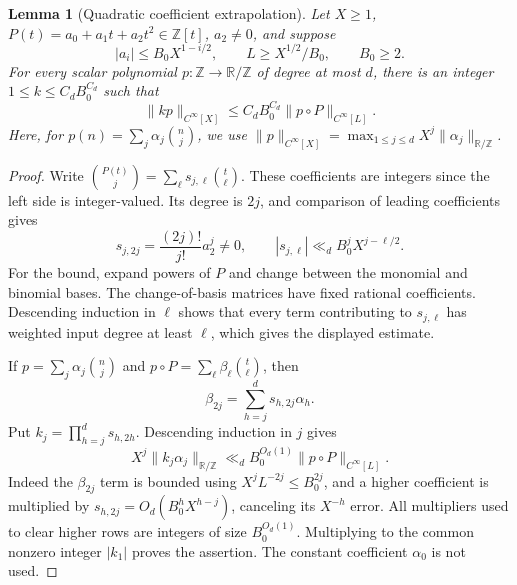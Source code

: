 \documentclass[11pt]{article}
\newtheorem{lemma}[theorem]{Lemma}
\theoremstyle{definition}
\theoremstyle{remark}
\begin{document}
\begin{lemma}[Quadratic coefficient extrapolation]\label{lem:gn-quadratic-coefficients}
Let $X\geq1$, $P(t)=a_0+a_1t+a_2t^2\in\mathbb Z[t]$, $a_2\ne0$, and suppose
\[
 |a_i|\leq B_0X^{1-i/2},\qquad
 L\geq X^{1/2}/B_0,\qquad B_0\geq2.
\]
For every scalar polynomial $p:\mathbb Z\to\mathbb R/\mathbb Z$ of
degree at most $d$, there is an integer $1\leq k\leq C_dB_0^{C_d}$ such
that
\[
 \|kp\|_{C^\infty[X]}
   \leq C_dB_0^{C_d}\|p\circ P\|_{C^\infty[L]}.
\]
Here, for $p(n)=\sum_j\alpha_j\binom nj$, we use
$\|p\|_{C^\infty[X]}=\max_{1\leq j\leq d}X^j
\|\alpha_j\|_{\mathbb R/\mathbb Z}$.
\end{lemma}
\begin{proof}
Write $\binom{P(t)}j=\sum_\ell s_{j,\ell}\binom t\ell$. These
coefficients are integers since the left side is integer-valued. Its
degree is $2j$, and comparison of leading coefficients gives
\[
 s_{j,2j}=\frac{(2j)!}{j!}a_2^j\ne0,
 \qquad |s_{j,\ell}|\ll_d B_0^jX^{j-\ell/2}.
\]
For the bound, expand powers of $P$ and change between the monomial and
binomial bases. The change-of-basis matrices have fixed rational
coefficients. Descending induction in $\ell$ shows that every term
contributing to $s_{j,\ell}$ has weighted input degree at least $\ell$,
which gives the displayed estimate.

If $p=\sum_j\alpha_j\binom nj$ and
$p\circ P=\sum_\ell\beta_\ell\binom t\ell$, then
\[
 \beta_{2j}=\sum_{h=j}^d s_{h,2j}\alpha_h.
\]
Put $k_j=\prod_{h=j}^d s_{h,2h}$. Descending induction in $j$ gives
\[
 X^j\|k_j\alpha_j\|_{\mathbb R/\mathbb Z}
   \ll_d B_0^{O_d(1)}\|p\circ P\|_{C^\infty[L]}.
\]
Indeed the $\beta_{2j}$ term is bounded using
$X^jL^{-2j}\leq B_0^{2j}$, and a higher coefficient is multiplied by
$s_{h,2j}=O_d(B_0^hX^{h-j})$, canceling its $X^{-h}$ error.
All multipliers used to clear higher rows are integers of size
$B_0^{O_d(1)}$. Multiplying to the common nonzero integer $|k_1|$ proves
the assertion. The constant coefficient $\alpha_0$ is not used.
\end{proof}
\end{document}
